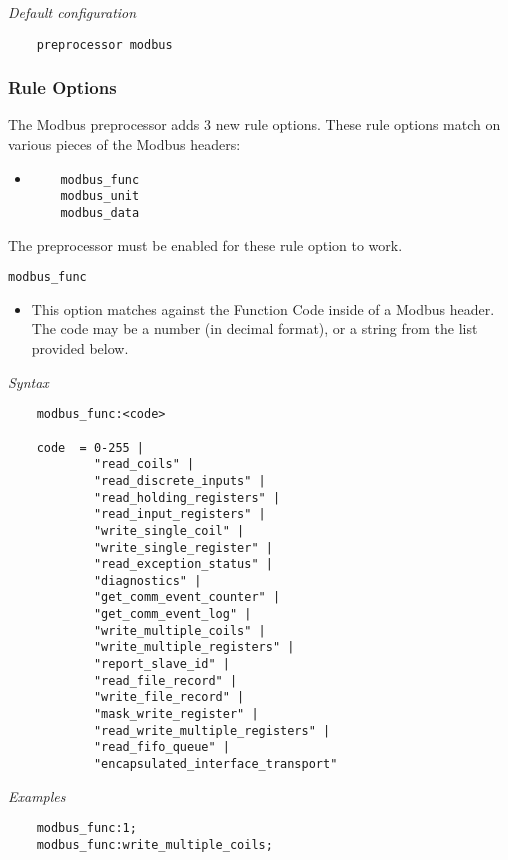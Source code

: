 \documentclass[english]{report}
\begin{document}
\textit{Default configuration}
\footnotesize
\begin{verbatim}
    preprocessor modbus
\end{verbatim}
\normalsize

\subsubsection{Rule Options}
The Modbus preprocessor adds 3 new rule options. These rule options match on
various pieces of the Modbus headers:

\begin{itemize}
\item[]
\begin{verbatim}
    modbus_func
    modbus_unit
    modbus_data
\end{verbatim}
\end{itemize}

The preprocessor must be enabled for these rule option to work.

\texttt{modbus\_func}
\label{modbus:modbus_func}
\begin{itemize}
 \item[] This option matches against the Function Code inside of a Modbus
 header. The code may be a number (in decimal format), or a string from the
 list provided below.
\end{itemize}

\textit{Syntax}
\footnotesize
\begin{verbatim}
    modbus_func:<code>

    code  = 0-255 |
            "read_coils" |
            "read_discrete_inputs" |
            "read_holding_registers" |
            "read_input_registers" |
            "write_single_coil" |
            "write_single_register" |
            "read_exception_status" |
            "diagnostics" |
            "get_comm_event_counter" |
            "get_comm_event_log" |
            "write_multiple_coils" |
            "write_multiple_registers" |
            "report_slave_id" |
            "read_file_record" |
            "write_file_record" |
            "mask_write_register" |
            "read_write_multiple_registers" |
            "read_fifo_queue" |
            "encapsulated_interface_transport"
\end{verbatim}
\normalsize
\textit{Examples}
\footnotesize
\begin{verbatim}
    modbus_func:1;
    modbus_func:write_multiple_coils;
\end{verbatim}
\normalsize
\end{document}
